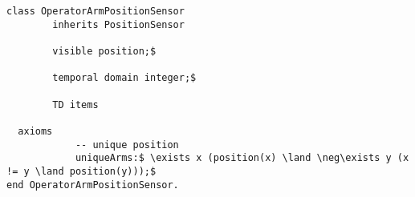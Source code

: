 \begin{lstlisting}[fontadjust, mathescape, frame=tlb] 
class OperatorArmPositionSensor
        inherits PositionSensor

        visible position;$

        temporal domain integer;$

        TD items
  
  axioms
            -- unique position
            uniqueArms:$ \exists x (position(x) \land \neg\exists y (x != y \land position(y)));$
end OperatorArmPositionSensor.\end{lstlisting}
